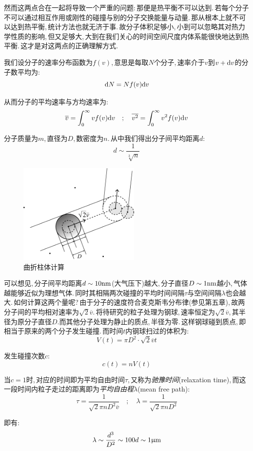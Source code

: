 然而这两点合在一起将导致一个严重的问题:\,那便是热平衡不可以达到.\,若每个分子不可以通过相互作用或刚性的碰撞与别的分子交换能量与动量.\,那从根本上就不可以达到热平衡,\,统计方法也就无济于事.\,故分子体积足够小,\,小到可以忽略其对热力学性质的影响,\,但又足够大,\,大到在我们关心的时间空间尺度内体系能很快地达到热平衡.\,这才是对这两点的正确理解方式.

我们设分子的速率分布函数为$f(v)$,\,意思是每取$N$个分子,\,速率介于$v$到$v+\textrm{d} v$的分子数平均为:
\[\textrm{d} N=Nf(v)\textrm{d} v\]

从而分子的平均速率与方均速率为:
\[\overline{v}=\int_0^\infty vf(v)\textrm{d} v \quad ; \quad \overline{v^2}=\int_0^\infty v^2 f(v)\textrm{d} v\]

分子质量为$m$,\,直径为$D$,\,数密度为$n$.\,从中我们得出分子间平均距离$d$:
\[d\sim\frac{1}{\sqrt[3]{n}}\]

\begin{figure}
\centering
\includegraphics[width=6cm]{image/5-1-4.png}
\caption{曲折柱体计算}
\end{figure}
可以想见,\,分子间平均距离$d\sim 10{\rm nm}$(大气压下)越大,\,分子直径$D\sim 1{\rm nm}$越小,\,气体越能够近似为理想气体.\,同时其相隔两次碰撞的平均时间间隔$\tau$与空间间隔$\lambda$也会越大.\,如何计算这两个量呢?\,由于分子的速度符合麦克斯韦分布律(参见第五章),\,故两分子间的平均相对速率为$\sqrt{2}\overline{v}$.\,将待研究的粒子处理为钢球,\,速率恒定为$\sqrt{2}\overline{v}$,\,其半径为原分子直径$D$.而其他分子处理为静止的质点,\,半径为零.\,这样钢球碰到质点,\,即相当于原来的两个分子发生碰撞.\,而时间$t$内钢球扫过的体积为:
\[V(t)=\pi D^2\cdot \sqrt{2}\overline{v}t\]

发生碰撞次数$c$:
\[c(t)=nV(t)\]

当$c=1$时,\,对应的时间即为平均自由时间$\tau$,\,又称为\emph{驰豫时间}(relaxation time),\,而这一段时间内粒子走过的距离即为\emph{平均自由程}$\lambda$(mean free path):
\[\tau=\frac{1}{\sqrt{2}\pi nD^2\overline{v}} \quad ; \quad \lambda=\frac{1}{\sqrt{2}\pi nD^2}\]

即有:
\[\lambda\sim\frac{d^3}{D^2}\sim 100d\sim 1{\rm \upmu m}\]

